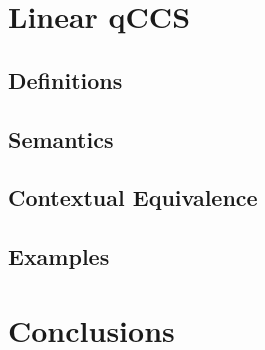 \documentclass[10pt,a4paper, titlepage]{report}
\begin{document}
\chapter{Linear qCCS}

\section{Definitions}


\section{Semantics}



\section{Contextual Equivalence}


\section{Examples}




%
%

\chapter{Conclusions}
\printbibliography[
heading=bibintoc,
title={Bibliography}
]
\end{document}
